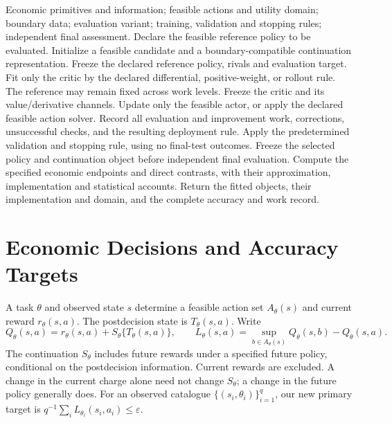 \documentclass[ecta,nameyear,draft]{econsocart}
\theoremstyle{definition}
\theoremstyle{remark}
\begin{document}
\begin{algorithm}[t]
\caption{Neural Bellman evaluation, feasible improvement, and economic assessment}\label{alg:nbo}
\begin{algorithmic}[1]
\Require Economic primitives and information; feasible actions and utility domain; boundary data; evaluation variant; training, validation and stopping rules; independent final assessment.
\State Declare the feasible reference policy to be evaluated. Initialize a feasible candidate and a boundary-compatible continuation representation.
 \State Freeze the declared reference policy, rivals and evaluation target. Fit only the critic by the declared differential, positive-weight, or rollout rule. The reference may remain fixed across work levels.
 \State Freeze the critic and its value/derivative channels. Update only the feasible actor, or apply the declared feasible action solver.
 \State Record all evaluation and improvement work, corrections, unsuccessful checks, and the resulting deployment rule.
 \State Apply the predetermined validation and stopping rule, using no final-test outcomes.
\EndFor
\State Freeze the selected policy and continuation object before independent final evaluation.
\State Compute the specified economic endpoints and direct contrasts, with their approximation, implementation and statistical accounts.
\State Return the fitted objects, their implementation and domain, and the complete accuracy and work record.
\end{algorithmic}
\end{algorithm}

\section{Economic Decisions and Accuracy Targets}\label{sec:r19targets}
A task $\theta$ and observed state $s$ determine a feasible action set
$A_\theta(s)$ and current reward $r_\theta(s,a)$. The postdecision state is
$T_\theta(s,a)$. Write
\begin{equation}
 Q_\theta(s,a)=r_\theta(s,a)+S_\theta\{T_\theta(s,a)\},\qquad
 L_\theta(s,a)=\sup_{b\in A_\theta(s)}Q_\theta(s,b)-Q_\theta(s,a).
 \label{eq:r19objective}
\end{equation}
The continuation $S_\theta$ includes future rewards under a specified future
policy, conditional on the postdecision information. Current rewards are
excluded. A change in the current charge alone need not change $S_\theta$;
a change in the future policy generally does. For an observed catalogue
$\{(s_i,\theta_i)\}_{i=1}^q$, our new primary target is
$q^{-1}\sum_i L_{\theta_i}(s_i,a_i)\leq\varepsilon$.
\end{document}
